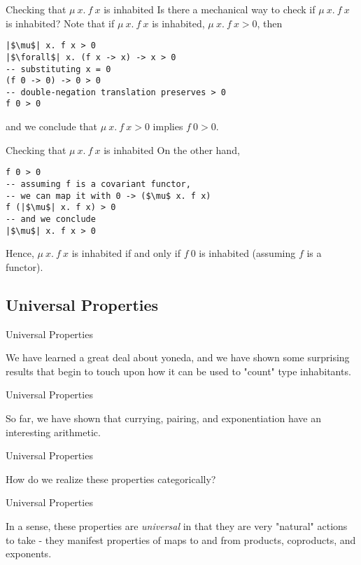 \documentclass[tikz]{beamer}
\theoremstyle{definition}
\begin{document}
\begin{frame}[fragile]{Checking that $\mu~x.~f~x$ is inhabited}
Is there a mechanical way to check if $\mu~x.~f~x$ is inhabited? Note that if $\mu~x.~f~x$ is inhabited, $\mu~x.~f~x > 0$, then
\begin{verbatim}
|$\mu$| x. f x > 0
|$\forall$| x. (f x -> x) -> x > 0
-- substituting x = 0
(f 0 -> 0) -> 0 > 0
-- double-negation translation preserves > 0
f 0 > 0
\end{verbatim}
and we conclude that $\mu~x.~f~x > 0$ implies $f~0 > 0$.
\end{frame}
\begin{frame}[fragile]{Checking that $\mu~x.~f~x$ is inhabited}
On the other hand,
\begin{verbatim}
f 0 > 0
-- assuming f is a covariant functor,
-- we can map it with 0 -> ($\mu$ x. f x)
f (|$\mu$| x. f x) > 0
-- and we conclude
|$\mu$| x. f x > 0
\end{verbatim}
Hence, $\mu~x.~f~x$ is inhabited if and only if $f~0$ is inhabited (assuming $f$ is a functor).
\end{frame}

\subsection{Universal Properties}

\begin{frame}{Universal Properties}

We have learned a great deal about yoneda, and we have shown some surprising results that begin to touch upon how it can be used to "count" type inhabitants.
\end{frame}

\begin{frame}{Universal Properties}

So far, we have shown that currying, pairing, and exponentiation have an interesting arithmetic.

\end{frame}

\begin{frame}{Universal Properties}

How do we realize these properties categorically?

\end{frame}

\begin{frame}{Universal Properties}

In a sense, these properties are \textit{universal} in that they are very "natural" actions to take - they manifest properties of maps to and from products, coproducts, and exponents.

\end{frame}
\end{document}
